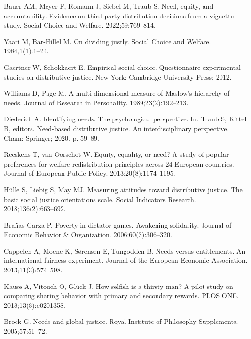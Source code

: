 \documentclass[10pt,letterpaper]{article}
\begin{document}
\begin{thebibliography}{100}
Bauer AM, Meyer F, Romann J, Siebel M, Traub S.
\newblock Need, equity, and accountability. {Evidence} on third-party
  distribution decisions from a vignette study.
\newblock Social Choice and Welfare. 2022;59:769--814.

Yaari M, Bar-Hillel M.
\newblock On dividing justly.
\newblock Social Choice and Welfare. 1984;1(1):1--24.

Gaertner W, Schokkaert E.
\newblock Empirical social choice. {Questionnaire}-experimental studies on
  distributive justice.
\newblock New York: Cambridge University Press; 2012.

Williams D, Page M.
\newblock A multi-dimensional measure of {Maslow}'s hierarchy of needs.
\newblock Journal of Research in Personality. 1989;23(2):192--213.

Diederich A.
\newblock Identifying needs. {The} psychological perspective.
\newblock In: Traub S, Kittel B, editors. Need-based distributive justice. {An}
  interdisciplinary perspective. Cham: Springer; 2020. p. 59--89.

Reeskens T, van Oorschot W.
\newblock Equity, equality, or need? {A} study of popular preferences for
  welfare redistribution principles across 24 {European} countries.
\newblock Journal of European Public Policy. 2013;20(8):1174--1195.

Hülle S, Liebig S, May MJ.
\newblock Measuring attitudes toward distributive justice. {The} basic social
  justice orientations scale.
\newblock Social Indicators Research. 2018;136(2):663--692.

Brañas-Garza P.
\newblock Poverty in dictator games. {Awakening} solidarity.
\newblock Journal of Economic Behavior \& Organization. 2006;60(3):306--320.

Cappelen A, Moene K, Sørensen E, Tungodden B.
\newblock Needs versus entitlements. {An} international fairness experiment.
\newblock Journal of the European Economic Association. 2013;11(3):574--598.

Kause A, Vitouch O, Glück J.
\newblock How selfish is a thirsty man? {A} pilot study on comparing sharing
  behavior with primary and secondary rewards.
\newblock PLOS ONE. 2018;13(8):e0201358.

Brock G.
\newblock Needs and global justice.
\newblock Royal Institute of Philosophy Supplements. 2005;57:51--72.


\end{thebibliography}
\end{document}
